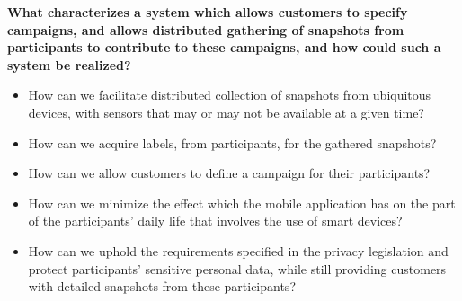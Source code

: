 

\textbf{What characterizes a system which allows customers to specify campaigns, and allows distributed gathering of snapshots from participants to contribute to these campaigns, and how could such a system be realized?}

\begin{itemize}
	\setlength\itemsep{-0.2em}
    \item How can we facilitate distributed collection of snapshots from ubiquitous devices, with sensors that may or may not be available at a given time?

    \item How can we acquire labels, from participants, for the gathered snapshots?  
    
    \item How can we allow customers to define a campaign for their participants?
    
    \item How can we minimize the effect which the mobile application has on the part of the participants' daily life that involves the use of smart devices?

    \item How can we uphold the requirements specified in the privacy legislation and protect participants' sensitive personal data, while still providing customers with detailed snapshots from these participants? 
\end{itemize}

